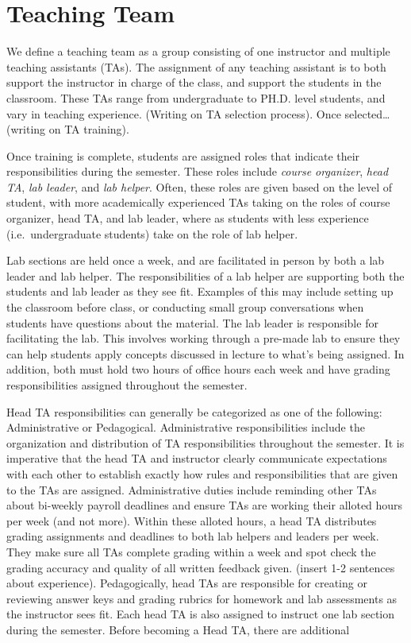 \documentclass[
  12pt]{article}
\begin{document}
\hypertarget{teaching-team}{%
\section{Teaching Team}\label{teaching-team}}

We define a teaching team as a group consisting of one instructor and
multiple teaching assistants (TAs). The assignment of any teaching
assistant is to both support the instructor in charge of the class, and
support the students in the classroom. These TAs range from
undergraduate to PH.D. level students, and vary in teaching experience.
(Writing on TA selection process). Once selected\ldots{} (writing on TA
training).

Once training is complete, students are assigned roles that indicate
their responsibilities during the semester. These roles include
\emph{course organizer}, \emph{head TA}, \emph{lab leader}, and
\emph{lab helper}. Often, these roles are given based on the level of
student, with more academically experienced TAs taking on the roles of
course organizer, head TA, and lab leader, where as students with less
experience (i.e.~undergraduate students) take on the role of lab helper.

Lab sections are held once a week, and are facilitated in person by both
a lab leader and lab helper. The responsibilities of a lab helper are
supporting both the students and lab leader as they see fit. Examples of
this may include setting up the classroom before class, or conducting
small group conversations when students have questions about the
material. The lab leader is responsible for facilitating the lab. This
involves working through a pre-made lab to ensure they can help students
apply concepts discussed in lecture to what's being assigned. In
addition, both must hold two hours of office hours each week and have
grading responsibilities assigned throughout the semester.

Head TA responsibilities can generally be categorized as one of the
following: Administrative or Pedagogical. Administrative
responsibilities include the organization and distribution of TA
responsibilities throughout the semester. It is imperative that the head
TA and instructor clearly communicate expectations with each other to
establish exactly how rules and responsibilities that are given to the
TAs are assigned. Administrative duties include reminding other TAs
about bi-weekly payroll deadlines and ensure TAs are working their
alloted hours per week (and not more). Within these alloted hours, a
head TA distributes grading assignments and deadlines to both lab
helpers and leaders per week. They make sure all TAs complete grading
within a week and spot check the grading accuracy and quality of all
written feedback given. (insert 1-2 sentences about experience).
Pedagogically, head TAs are responsible for creating or reviewing answer
keys and grading rubrics for homework and lab assessments as the
instructor sees fit. Each head TA is also assigned to instruct one lab
section during the semester. Before becoming a Head TA, there are
additional
\end{document}
